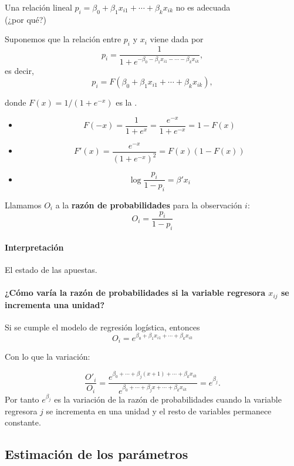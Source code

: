 Una relación lineal $p_i=\beta_0+\beta_1x_{i1}+\cdots+\beta_kx_{ik}$ no es adecuada\\ (¿por qué?)

Suponemos que la relación entre $p_i$ y $x_i$ viene dada por 
\[p_i = \frac{1}{1+e^{-\beta_0-\beta_1x_{i1}-\cdots-\beta_kx_{ik}}},\]
es decir,
\[p_i = F(\beta_0+\beta_1x_{i1}+\cdots+\beta_kx_{ik}),\]

donde $F(x)=1/(1+e^{-x})$ es la .


\obs 

\begin{itemize}
  \item \[F(-x) = \frac{1}{1+e^{x}} = \frac{e^{-x}}{1 + e^{-x}} = 1 - F(x)\]
  \item \[F'(x) = \frac{e^{-x}}{(1+e^{-x})^2} = F(x)(1-F(x))\]
  \item \[\log\frac{p_i}{1-p_i} = β'x_i\]
\end{itemize}


\begin{defn}
Llamamos $O_i$ a la \textbf{razón de probabilidades} para la observación $i$:
\[
 O_i=\frac{p_i}{1-p_i} 
\]
\end{defn}
\paragraph{Interpretación} El estado de las apuestas. 


\paragraph{¿Cómo varía la razón de probabilidades si la variable regresora $x_{ij}$ se incrementa una unidad?}

Si se cumple el modelo de regresión logística, entonces
\[
O_i =  e^{\beta_0  + \beta_1x_{i1} + \cdots + \beta_kx_{ik}}
\]

Con lo que la variación:

\[
\frac{O'_i}{O_i} = \frac{e^{\beta_0+\cdots+\beta_j(x+1)+\cdots+\beta_kx_{ik}}}{e^{\beta_0+\cdots+\beta_jx+\cdots+\beta_kx_{ik}}}= e^{\beta_j}.
\]  
Por tanto $e^{\beta_j}$ es la variación de la razón de probabilidades cuando la variable regresora $j$ se incrementa en una unidad y el resto de variables permanece constante. 


\subsection{Estimación de los parámetros}


